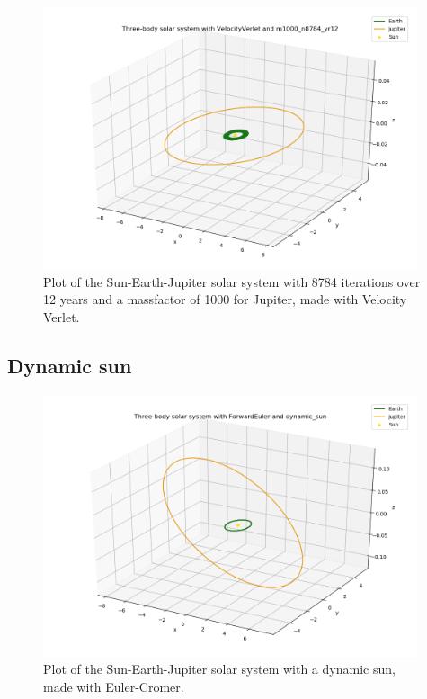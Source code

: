 \documentclass{article}
\begin{document}
    \begin{figure}[H]
        \centering
        \includegraphics[width = 11cm]{img/plot3D_S_E_J_V_m1000_n8784_yr12.png}
        \caption{Plot of the Sun-Earth-Jupiter solar system with 8784 iterations over 12 years and a massfactor of 1000 for Jupiter, made with Velocity Verlet.}
        \label{fig:plot3D_S_E_J_V_m1000_n8784_yr12}
    \end{figure}

\subsection{Dynamic sun}

    \begin{figure}[H]
        \centering
        \includegraphics[width = 11cm]{img/plot3D_S_E_J_F_dynamic_sun.png}
        \caption{Plot of the Sun-Earth-Jupiter solar system with a dynamic sun, made with Euler-Cromer.}
        \label{fig:plot3D_S_E_J_F_dynamic_sun}
    \end{figure}
\end{document}
